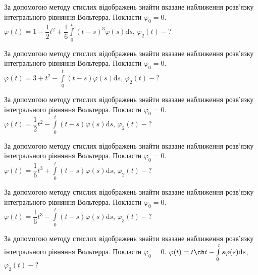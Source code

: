 \documentclass[12pt]{extarticle}
\begin{document}
\begin{Exercise}
За допомогою методу стислих відображень знайти вказане наближення розв’язку інтегрального рівняння Вольтерра. Покласти $\varphi_0=0$. $\varphi(t) = 1 - \dfrac{1}{2}t^2 + \dfrac{1}{6}\int\limits_{0}^{t} (t-s)^3 \varphi(s) \mathrm{d}s$, $\varphi_2(t) - ?$
\end{Exercise}

\begin{Exercise}
За допомогою методу стислих відображень знайти вказане наближення розв’язку інтегрального рівняння Вольтерра. Покласти $\varphi_0=0$. $\varphi(t) = 3 + t^2 - \int\limits_{0}^{t} (t-s)\varphi(s) \mathrm{d}s$, $\varphi_2(t) - ?$
\end{Exercise}

\begin{Exercise}
За допомогою методу стислих відображень знайти вказане наближення розв’язку інтегрального рівняння Вольтерра. Покласти $\varphi_0=0$. $\varphi(t) = \dfrac{1}{2}t^2 - \int\limits_{0}^{t} (t-s)\varphi(s) \mathrm{d}s$, $\varphi_2(t) - ?$
\end{Exercise}

\begin{Exercise}
За допомогою методу стислих відображень знайти вказане наближення розв’язку інтегрального рівняння Вольтерра. Покласти $\varphi_0=0$. $\varphi(t) = \dfrac{1}{6}t^3 + \int\limits_{0}^{t} (t-s) \varphi(s) \mathrm{d}s$, $\varphi_2(t) - ?$
\end{Exercise}

\begin{Exercise}
За допомогою методу стислих відображень знайти вказане наближення розв’язку інтегрального рівняння Вольтерра. Покласти $\varphi_0=0$. $\varphi(t) = \dfrac{1}{6}t^3 - \int\limits_{0}^{t} (t-s) \varphi(s) \mathrm{d}s$, $\varphi_3(t) - ?$
\end{Exercise}

\begin{Exercise}
За допомогою методу стислих відображень знайти вказане наближення розв’язку інтегрального рівняння Вольтерра. Покласти $\varphi_0=0$. $\varphi(t) = t \ch t - \int\limits_{0}^{t} s\varphi(s) \mathrm{d}s$, $\varphi_2(t) - ?$
\end{Exercise}
\end{document}
